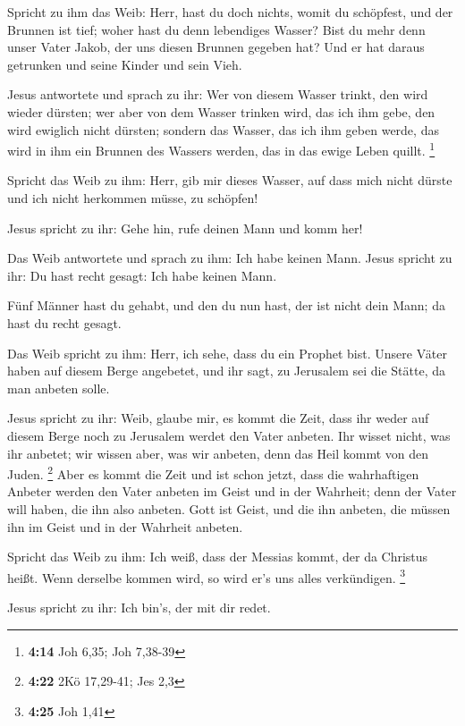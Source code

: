  Spricht zu ihm das Weib: Herr, hast du doch nichts, womit
du schöpfest, und der Brunnen ist tief; woher hast du denn lebendiges
Wasser?  Bist du mehr denn unser Vater Jakob, der uns
diesen Brunnen gegeben hat? Und er hat daraus getrunken und seine Kinder
und sein Vieh.

 Jesus antwortete und sprach zu ihr: Wer von diesem Wasser
trinkt, den wird wieder dürsten;  wer aber von dem Wasser
trinken wird, das ich ihm gebe, den wird ewiglich nicht dürsten; sondern
das Wasser, das ich ihm geben werde, das wird in ihm ein Brunnen des
Wassers werden, das in das ewige Leben quillt. \footnote{\textbf{4:14}
  Joh 6,35; Joh 7,38-39}

 Spricht das Weib zu ihm: Herr, gib mir dieses Wasser, auf
dass mich nicht dürste und ich nicht herkommen müsse, zu schöpfen!

 Jesus spricht zu ihr: Gehe hin, rufe deinen Mann und komm
her!

 Das Weib antwortete und sprach zu ihm: Ich habe keinen
Mann. Jesus spricht zu ihr: Du hast recht gesagt: Ich habe keinen Mann.

 Fünf Männer hast du gehabt, und den du nun hast, der ist
nicht dein Mann; da hast du recht gesagt.

 Das Weib spricht zu ihm: Herr, ich sehe, dass du ein
Prophet bist.  Unsere Väter haben auf diesem Berge
angebetet, und ihr sagt, zu Jerusalem sei die Stätte, da man anbeten
solle.

 Jesus spricht zu ihr: Weib, glaube mir, es kommt die Zeit,
dass ihr weder auf diesem Berge noch zu Jerusalem werdet den Vater
anbeten.  Ihr wisset nicht, was ihr anbetet; wir wissen
aber, was wir anbeten, denn das Heil kommt von den Juden. \footnote{\textbf{4:22}
  2Kö 17,29-41; Jes 2,3}  Aber es kommt die Zeit und ist
schon jetzt, dass die wahrhaftigen Anbeter werden den Vater anbeten im
Geist und in der Wahrheit; denn der Vater will haben, die ihn also
anbeten.  Gott ist Geist, und die ihn anbeten, die müssen
ihn im Geist und in der Wahrheit anbeten.

 Spricht das Weib zu ihm: Ich weiß, dass der Messias kommt,
der da Christus heißt. Wenn derselbe kommen wird, so wird er's uns alles
verkündigen. \footnote{\textbf{4:25} Joh 1,41}

 Jesus spricht zu ihr: Ich bin's, der mit dir redet.

